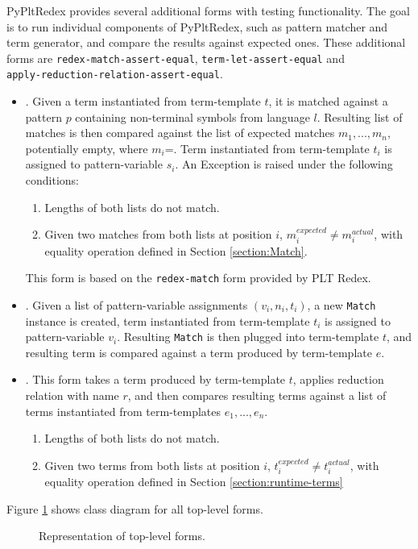 PyPltRedex provides several additional forms with testing functionality. The goal is to run individual components of PyPltRedex, such as pattern matcher and term generator, and compare the results against expected ones. These additional forms are \texttt{redex-match-assert-equal}, \texttt{term-let-assert-equal} and \\ \texttt{apply-reduction-relation-assert-equal}. 

\begin{itemize}
\item \RedexMatchAssertEqual. Given a term instantiated from term-template $t$, it is matched against a pattern $p$ containing non-terminal symbols from language $l$. Resulting list of matches is then compared against the list of expected matches $m_1,...,m_n$, potentially empty, where $m_i$=\Match. Term instantiated from term-template $t_i$ is assigned to pattern-variable $s_i$. An Exception is raised under the following conditions:
	\begin{enumerate}
	\item Lengths of both lists do not match.
	\item Given two matches from both lists at position $i$, $m_i^{expected} \neq m_i^{actual}$, with equality operation defined in Section \ref{section:Match}.
	\end{enumerate}
	This form is based on the \texttt{redex-match} form provided by PLT Redex.

\item \TermLetAssertEqual. Given a list of pattern-variable assignments $(v_i, n_i, t_i)$, a new \texttt{Match} instance is created, term instantiated from term-template $t_i$ is assigned to pattern-variable $v_i$. Resulting \texttt{Match} is then plugged into term-template $t$, and resulting term is compared against a term produced by term-template $e$.

\item \ApplyReductionRelationAssertEqual. This form takes a term produced by term-template $t$, applies reduction relation with name $r$, and then compares resulting terms against a list of terms instantiated from term-templates $e_1,...,e_n$.
	\begin{enumerate}
	\item Lengths of both lists do not match.
	\item Given two terms from both lists at position $i$, $t_i^{expected} \neq t_i^{actual}$, with equality operation defined in Section \ref{section:runtime-terms}
	\end{enumerate}
\end{itemize}

Figure \ref{class-diagram-toplevel} shows class diagram for all top-level forms.

\begin{figure}[H]
	\centering
	\caption{Representation of top-level forms.}
\label{class-diagram-toplevel}
\end{figure}
